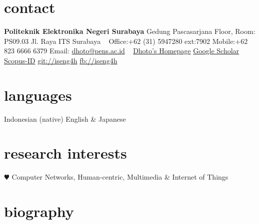 \documentclass[]{friggeri-cv} %
\begin{document}


\begin{aside} %
\section{contact}
\textbf{Politeknik Elektronika Negeri Surabaya}
Gedung Pascasarjana  Floor, Room: PS09.03
Jl. Raya ITS Surabaya
~
Office:+62 (31) 5947280 ext:7902
Mobile:+62 823 6666 6379
Email: \href{mailto:dhoto@pens.ac.id}{dhoto@pens.ac.id}
~
\href{http://dhoto.lecturer.pens.ac.id/}{Dhoto's Homepage}
\href{https://scholar.google.co.id/citations?user=M6sGfNQAAAAJ&hl=en&oi=ao}{Google Scholar}
\href{https://www.scopus.com/authid/detail.uri?authorId=35100882700}{Scopus-ID}
\href{http://github.com/iseng4h}{git://iseng4h}
\href{http://facebook.com/iseng4h}{fb://iseng4h}
\section{languages}
Indonesian (native)
English \& Japanese 
\section{research interests}
{\color{red} $\varheartsuit$} Computer Networks,
Human-centric, Multimedia \& Internet of Things
\end{aside}


\section{biography}
\end{document}
